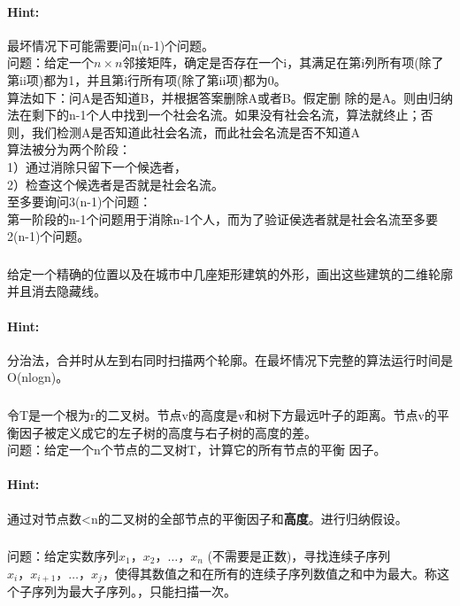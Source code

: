 \documentclass{article}
\begin{document}
     \paragraph{Hint:}最坏情况下可能需要问n(n-1)个问题。\\
        问题：给定一个$n\times n$邻接矩阵，确定是否存在一个i，其满足在第i列所有项(除了第ii项)都为1，并且第i行所有项(除了第ii项)都为0。\\
        算法如下：问A是否知道B，并根据答案删除A或者B。假定删
除的是A。则由归纳法在剩下的n-1个人中找到一个社会名流。如果没有社会名流，算法就终止；否则，我们检测A是否知道此社会名流，而此社会名流是否不知道A\\
算法被分为两个阶段：\\
1）通过消除只留下一个候选者，\\
2）检查这个候选者是否就是社会名流。\\
至多要询问3(n-1)个问题：\\
第一阶段的n-1个问题用于消除n-1个人，而为了验证侯选者就是社会名流至多要2(n-1)个问题。\\
     
     \subsubsection{}给定一个精确的位置以及在城市中几座矩形建筑的外形，画出这些建筑的二维轮廓并且消去隐藏线。
     \paragraph{Hint:}分治法，合并时从左到右同时扫描两个轮廓。在最坏情况下完整的算法运行时间是O(nlogn)。
     
     
     \subsubsection{}令T是一个根为r的二叉树。节点v的高度是v和树下方最远叶子的距离。节点v的平衡因子被定义成它的左子树的高度与右子树的高度的差。\\
     问题：给定一个n个节点的二叉树T，计算它的所有节点的平衡
因子。\\
     \paragraph{Hint:}通过对节点数<n的二叉树的全部节点的平衡因子和\textbf{高度}。进行归纳假设。
     
     
     
     \subsubsection{}问题：给定实数序列$x_{1}，x_{2}，…，x_{n}$
(不需要是正数)，寻找连续子序列$x_{i}，x_{i+1}，…，x_{j}$，使得其数值之和在所有的连续子序列数值之和中为最大。称这个子序列为最大子序列。，只能扫描一次。
\end{document}
